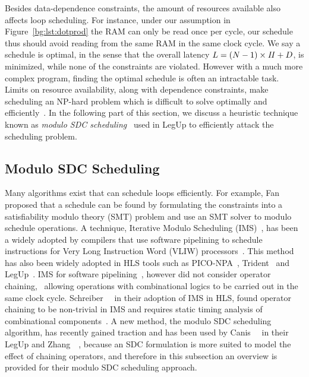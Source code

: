 Besides data-dependence constraints, the amount of resources available
also affects loop scheduling.  For instance, under our assumption in
Figure~\ref{bg:lst:dotprod} the RAM can only be read once per cycle, our
schedule thus should avoid reading from the same RAM in the same clock cycle.
We say a schedule is optimal, in the sense that the overall latency $L = (N -
1) \times \mathit{II} + D$, is minimized, while none of the constraints are violated.
However with a much more complex program, finding the optimal schedule is
often an intractable task.  Limits on resource availability, along with
dependence constraints, make scheduling an NP-hard problem which is difficult
to solve optimally and efficiently~\cite{hwang91}.  In the following part
of this section, we discuss a heuristic technique known as \emph{modulo SDC
scheduling}~\cite{zhang13, canis14} used in LegUp to efficiently attack the
scheduling problem.


\subsection{Modulo SDC Scheduling}
\label{bg:sub:modulo_sdc_scheduling}

Many algorithms exist that can schedule loops efficiently.  For example,
Fan~\etal~\cite{fan08} proposed that a schedule can be found by formulating
the constraints into a satisfiability modulo theory (SMT) problem and use
an SMT solver to modulo schedule operations.  A technique, Iterative Modulo
Scheduling (IMS)~\cite{rau94}, has been a widely adopted by compilers that use
software pipelining to schedule instructions for Very Long Instruction Word
(VLIW) processors~\cite{mcnairy03}.  This method has also been widely adopted
in HLS tools such as PICO-NPA~\cite{schreiber02}, Trident~\cite{tripp05} and
LegUp~\cite{canis13, canis14}.  IMS for software pipelining~\cite{rau94},
however did not consider operator chaining, \ie~allowing operations
with combinational logics to be carried out in the same clock cycle.
Schreiber~\etal~\cite{schreiber02} in their adoption of IMS in HLS, found
operator chaining to be non-trivial in IMS and requires static timing analysis
of combinational components~\cite{canis14}.  A new method, the modulo SDC
scheduling algorithm, has recently gained traction and has been used by
Canis~\etal~\cite{canis14} in their LegUp and Zhang~\etal~\cite{zhang13},
because an SDC formulation is more suited to model the effect of chaining
operators, and therefore in this subsection an overview is provided for their
modulo SDC scheduling approach.

